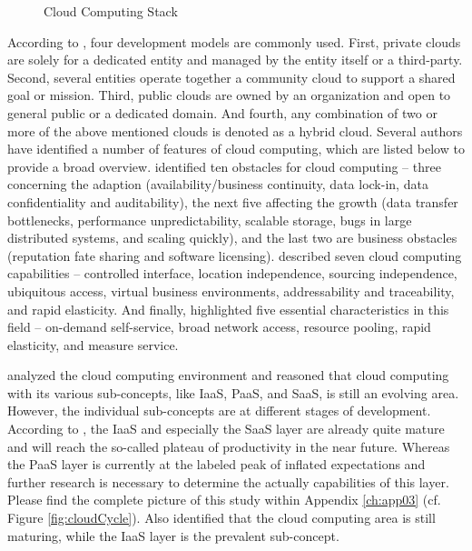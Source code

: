 \begin{figure}[tb]
	\centering
	
	\caption{Cloud Computing Stack}
	\label{fig:ccs}
\end{figure}

According to \citet[p. 3]{Mell2011}, four development models are commonly used. First, private clouds are solely for a dedicated entity and managed by the entity itself or a third-party. Second, several entities operate together a community cloud to support a shared goal or mission. Third, public clouds are owned by an organization and open to general public or a dedicated domain. And fourth, any combination of two or more of the above mentioned clouds is denoted as a hybrid cloud.
Several authors have identified a number of features of cloud computing, which are listed below to provide a broad overview. \citet[pp. 54-58]{Armbrust2010} identified ten obstacles for cloud computing -- three concerning the adaption (availability/business continuity, data lock-in, data confidentiality and auditability), the next five affecting the growth (data transfer bottlenecks, performance unpredictability, scalable storage, bugs in large distributed systems, and scaling quickly), and the last two are business obstacles (reputation fate sharing and software licensing). \citet[pp. 120-127]{Iyer2010} described seven cloud computing capabilities -- controlled interface, location independence, sourcing independence, ubiquitous access, virtual business environments, addressability and traceability, and rapid elasticity. And finally, \citet[p. 2]{Mell2011} highlighted five essential characteristics in this field -- on-demand self-service, broad network access, resource pooling, rapid elasticity, and measure service. 

\citet{Smith2012} analyzed the cloud computing environment and reasoned that cloud computing with its various sub-concepts, like \ac{IaaS}, \ac{PaaS}, and \ac{SaaS}, is still an evolving area. However, the individual sub-concepts are at different stages of development. According to \citet[p. 5]{Smith2012}, the \ac{IaaS} and especially the \ac{SaaS} layer are already quite mature and will reach the so-called plateau of productivity in the near future. Whereas the \ac{PaaS} layer is currently at the labeled peak of inflated expectations and further research is necessary to determine the actually capabilities of this layer. Please find the complete picture of this study within Appendix \ref{ch:app03} (cf. Figure \ref{fig:cloudCycle}). Also \citet[p. 120]{Iyer2010} identified that the cloud computing area is still maturing, while the \ac{IaaS} layer is the prevalent sub-concept.

